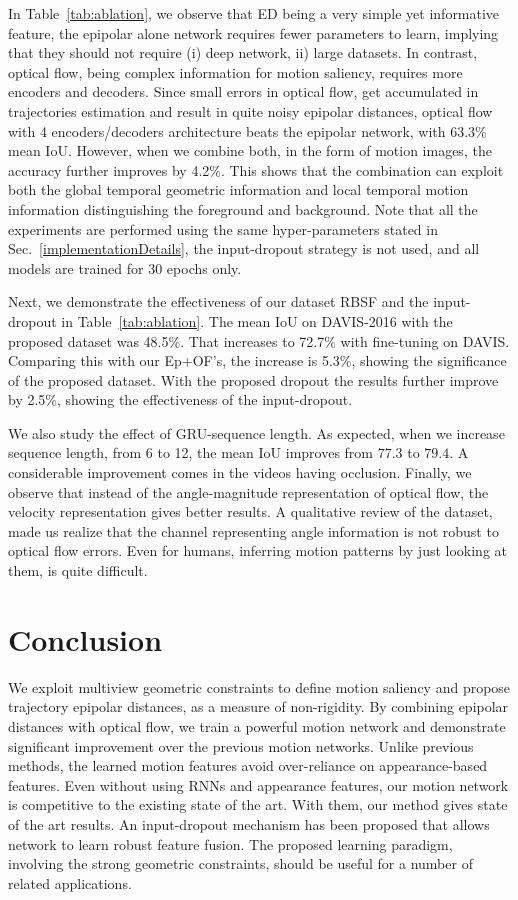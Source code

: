 \documentclass[10pt,twocolumn,letterpaper]{article}
\begin{document}
In Table~\ref{tab:ablation}, we observe that ED being a very simple yet informative feature, the epipolar alone network requires fewer parameters to learn, implying that they should not require (i) deep network, ii) large datasets. In contrast, optical flow, being complex information for motion saliency, requires more encoders and decoders. Since small errors in optical flow, get accumulated in trajectories estimation and result in quite noisy epipolar distances, optical flow with 4 encoders/decoders architecture beats the epipolar network, with 63.3\% mean IoU. However, when we combine both, in the form of motion images, the accuracy further improves by 4.2\%. This shows that the combination can exploit both the global temporal geometric information and local temporal motion information distinguishing the foreground and background. Note that all the experiments are performed using the same hyper-parameters stated in Sec.~\ref{implementationDetails}, the input-dropout strategy is not used, and all models are trained for 30 epochs only.

Next, we demonstrate the effectiveness of our dataset RBSF and the input-dropout in Table~\ref{tab:ablation}. The mean IoU on DAVIS-2016 with the proposed dataset was 48.5\%. That increases to 72.7\% with fine-tuning on DAVIS. Comparing this with our Ep+OF's, the increase is 5.3\%, showing the significance of the proposed dataset. With the proposed dropout the results further improve by 2.5\%, showing the effectiveness of the input-dropout. 

We also study the effect of GRU-sequence length. As expected, when we increase sequence length, from 6 to 12, the mean IoU improves from $77.3$ to $79.4$. A considerable improvement comes in the videos having occlusion. Finally, we observe that instead of the angle-magnitude representation of optical flow, the velocity representation gives better results. A qualitative review of the dataset, made us realize that the channel representing angle information is not robust to optical flow errors. Even for humans, inferring motion patterns by just looking at them, is quite difficult. 
\section{Conclusion}
We exploit multiview geometric constraints to define motion saliency and propose trajectory epipolar distances, as a measure of non-rigidity. By combining epipolar distances with optical flow, we train a powerful motion network and demonstrate significant improvement over the previous motion networks. Unlike previous methods, the learned motion features avoid over-reliance on appearance-based features. Even without using RNNs and appearance features, our motion network is competitive to the existing state of the art. With them, our method gives state of the art results.
An input-dropout mechanism has been proposed that allows network to learn robust feature fusion. 
The proposed learning paradigm, involving the strong geometric constraints, should be useful for a number of related applications.  


{\small


}
\end{document}
